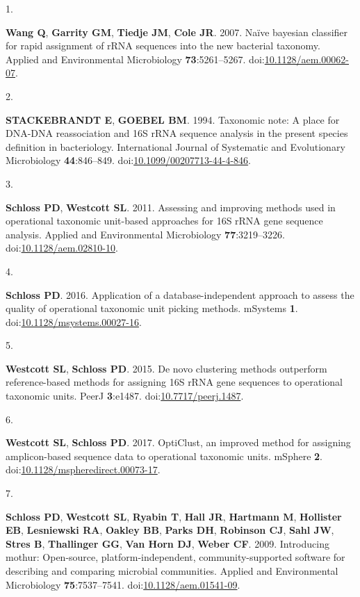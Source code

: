 \documentclass[
  11pt,
]{article}
\newlength{\cslhangindent}
\newlength{\csllabelwidth}
\newenvironment{CSLReferences}[2] %
 {\begin{list}{}{%
  \setlength{\itemindent}{0pt}
  \setlength{\leftmargin}{0pt}
  \setlength{\parsep}{0pt}
  \ifodd #1
   \setlength{\leftmargin}{\cslhangindent}
   \setlength{\itemindent}{-1\cslhangindent}
  \fi
  \setlength{\itemsep}{#2\baselineskip}}}
 {\end{list}}
\newcommand{\CSLLeftMargin}[1]{\parbox[t]{\csllabelwidth}{\strut#1\strut}}
\newcommand{\CSLRightInline}[1]{\parbox[t]{\linewidth - \csllabelwidth}{\strut#1\strut}}
\begin{document}
\label{refs}
\begin{CSLReferences}{0}{1}
\CSLLeftMargin{1. }%
\CSLRightInline{\textbf{Wang Q}, \textbf{Garrity GM}, \textbf{Tiedje
JM}, \textbf{Cole JR}. 2007. Naïve bayesian classifier for rapid
assignment of rRNA sequences into the new bacterial taxonomy. Applied
and Environmental Microbiology \textbf{73}:5261--5267.
doi:\href{https://doi.org/10.1128/aem.00062-07}{10.1128/aem.00062-07}.}

\CSLLeftMargin{2. }%
\CSLRightInline{\textbf{STACKEBRANDT E}, \textbf{GOEBEL BM}. 1994.
Taxonomic note: A place for DNA-DNA reassociation and 16S rRNA sequence
analysis in the present species definition in bacteriology.
International Journal of Systematic and Evolutionary Microbiology
\textbf{44}:846--849.
doi:\href{https://doi.org/10.1099/00207713-44-4-846}{10.1099/00207713-44-4-846}.}

\CSLLeftMargin{3. }%
\CSLRightInline{\textbf{Schloss PD}, \textbf{Westcott SL}. 2011.
Assessing and improving methods used in operational taxonomic unit-based
approaches for 16S rRNA gene sequence analysis. Applied and
Environmental Microbiology \textbf{77}:3219--3226.
doi:\href{https://doi.org/10.1128/aem.02810-10}{10.1128/aem.02810-10}.}

\CSLLeftMargin{4. }%
\CSLRightInline{\textbf{Schloss PD}. 2016. Application of a
database-independent approach to assess the quality of operational
taxonomic unit picking methods. mSystems \textbf{1}.
doi:\href{https://doi.org/10.1128/msystems.00027-16}{10.1128/msystems.00027-16}.}

\CSLLeftMargin{5. }%
\CSLRightInline{\textbf{Westcott SL}, \textbf{Schloss PD}. 2015. De novo
clustering methods outperform reference-based methods for assigning 16S
rRNA gene sequences to operational taxonomic units. PeerJ
\textbf{3}:e1487.
doi:\href{https://doi.org/10.7717/peerj.1487}{10.7717/peerj.1487}.}

\CSLLeftMargin{6. }%
\CSLRightInline{\textbf{Westcott SL}, \textbf{Schloss PD}. 2017.
OptiClust, an improved method for assigning amplicon-based sequence data
to operational taxonomic units. mSphere \textbf{2}.
doi:\href{https://doi.org/10.1128/mspheredirect.00073-17}{10.1128/mspheredirect.00073-17}.}

\CSLLeftMargin{7. }%
\CSLRightInline{\textbf{Schloss PD}, \textbf{Westcott SL},
\textbf{Ryabin T}, \textbf{Hall JR}, \textbf{Hartmann M},
\textbf{Hollister EB}, \textbf{Lesniewski RA}, \textbf{Oakley BB},
\textbf{Parks DH}, \textbf{Robinson CJ}, \textbf{Sahl JW}, \textbf{Stres
B}, \textbf{Thallinger GG}, \textbf{Van Horn DJ}, \textbf{Weber CF}.
2009. Introducing mothur: Open-source, platform-independent,
community-supported software for describing and comparing microbial
communities. Applied and Environmental Microbiology
\textbf{75}:7537--7541.
doi:\href{https://doi.org/10.1128/aem.01541-09}{10.1128/aem.01541-09}.}


\end{CSLReferences}
\end{document}
